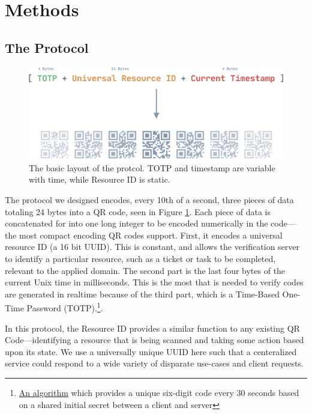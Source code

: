 \documentclass[10pt,twocolumn,letterpaper]{article}
\begin{document}
\section{Methods}

\subsection{The Protocol}

\begin{figure}[t]
   \begin{center}
      \includegraphics[width=\linewidth]{protoc.eps}
   \end{center}
      \caption{The basic layout of the protcol. TOTP and timestamp are variable with time, while Resource ID is static.}
   \label{fig:protocol}
   \end{figure}

The protocol we designed encodes, every 10th of a second, three pieces of data totaling 24 bytes into a QR code, seen in Figure \ref{fig:protocol}. Each piece of data is concatenated for into one long integer to be encoded numerically in the code—the most compact encoding QR codes support. First, it encodes a universal resource ID (a 16 bit UUID). This is constant, and allows the verification server to identify a particular resource, such as a ticket or task to be completed, relevant to the applied domain. The second part is the last four bytes of the current Unix time in milliseconds. This is the most that is needed to verify codes are generated in realtime because of the third part, which is a Time-Based One-Time Password (TOTP).\footnote{\href{https://en.wikipedia.org/wiki/Time-based_One-time_Password_algorithm}{An algorithm} which provides a unique six-digit code every 30 seconds based on a shared initial secret between a client and server}.

In this protocol, the Resource ID provides a similar function to any existing QR Code—identifying a resource that is being scanned and taking some action based upon its state. We use a universally unique UUID here such that a centeralized service could respond to a wide variety of disparate use-cases and client requests.
\end{document}
